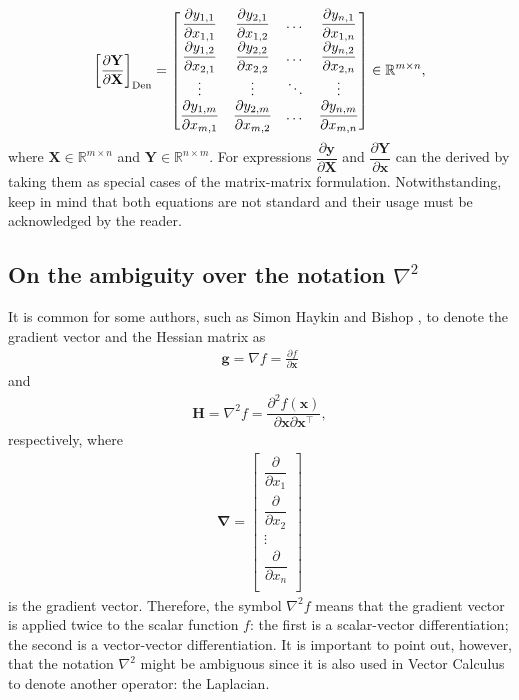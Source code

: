 \begin{align}
    \left[\frac{\partial \mathbf{Y}}{\partial\mathbf{X}}\right]_{\textnormal{Den}} = \begin{bmatrix}
        \dfrac{\partial y_{1,1}}{\partial x_{1,1}} & \dfrac{\partial y_{2,1}}{\partial x_{1,2}} & \dots & \dfrac{\partial y_{n,1}}{\partial x_{1,n}} \\
        \dfrac{\partial y_{1,2}}{\partial x_{2,1}} & \dfrac{\partial y_{2,2}}{\partial x_{2,2}} & \dots & \dfrac{\partial y_{n,2}}{\partial x_{2,n}} \\
        \vdots & \vdots & \ddots & \vdots \\
        \dfrac{\partial y_{1,m}}{\partial x_{m,1}} & \dfrac{\partial y_{2,m}}{\partial x_{m,2}} & \dots & \dfrac{\partial y_{n,m}}{\partial x_{m,n}} \\
    \end{bmatrix} \in \mathbb{R}^{m \times n},
\end{align}
where \(\mathbf{X}\in \mathbb{R}^{m\times n}\) and \(\mathbf{Y} \in \mathbb{R}^{n\times m}\). For expressions \(\dfrac{\partial \mathbf{y}}{\partial \mathbf{X}}\) and \(\dfrac{\partial \mathbf{Y}}{\partial \mathbf{x}}\) can the derived by taking them as special cases of the matrix-matrix formulation. Notwithstanding, keep in mind that both equations are not standard and their usage must be acknowledged by the reader.

\subsection{On the ambiguity over the notation \(\nabla^2\)}

It is common for some authors, such as Simon Haykin \cite{haykin2009neural} and Bishop \cite{bishopPatternRecognitionMachine2006}, to denote the gradient vector and the Hessian matrix as
\begin{align}
    \mathbf{g} = \nabla f = \frac{\partial f}{\partial \mathbf{x}}
\end{align}
and
\begin{align}
    \mathbf{H} = \nabla^{2} f = \dfrac{\partial^{2} f(\mathbf{x})}{\partial\mathbf{x}\partial\mathbf{x}^\top},
    \label{eq:H-nabla}
\end{align}
respectively, where
\begin{align}
    \mathbf{\nabla} = \begin{bmatrix}
        \dfrac{\partial}{\partial x_1} \\
        \dfrac{\partial}{\partial x_2} \\
        \vdots \\
        \dfrac{\partial}{\partial x_n} \\
    \end{bmatrix}
\end{align}
is the gradient vector. Therefore, the symbol \(\nabla^2 f\) means that the gradient vector is applied twice to the scalar function \(f\): the first is a scalar-vector differentiation; the second is a vector-vector differentiation. It is important to point out, however, that the notation \(\nabla^{2}\) might be ambiguous since it is also used in Vector Calculus to denote another operator: the Laplacian.

